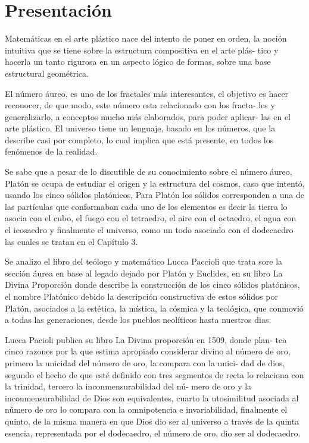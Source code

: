 \documentclass[a4paper]{book}
\begin{document}
\renewcommand\listtablename{Lista de tablas}
\listoftables
\newpage

\clearpage

\chapter*{Presentación}


Matemáticas en el arte plástico nace del intento de poner en orden, la
noción intuitiva que se tiene sobre la estructura compositiva en el arte plás-
tico y hacerla un tanto rigurosa en un aspecto lógico de formas, sobre una
base estructural geométrica.

El número áureo, es uno de los fractales más interesantes, el objetivo es
hacer reconocer, de que modo, este número esta relacionado con los fracta-
les y generalizarlo, a conceptos mucho más elaborados, para poder aplicar-
las en el arte plástico. El universo tiene un lenguaje, basado en los números,
que la describe casi por completo, lo cual implica que está presente, en todos
los fenómenos de la realidad.

Se sabe que a pesar de lo discutible de su conocimiento sobre el número
áureo, Platón se ocupa de estudiar el origen y la estructura del cosmos,
caso que intentó, usando los cinco sólidos platónicos, Para Platón los sólidos
corresponden a una de las partículas que conformaban cada uno de los
elementos es decir la tierra lo asocia con el cubo, el fuego con el tetraedro,
el aire con el octaedro, el agua con el icosaedro y finalmente el universo,
como un todo asociado con el dodecaedro las cuales se tratan en el Capítulo
3.

Se analizo el libro del teólogo y matemático Lucca Paccioli que trata
sore la sección áurea en base al legado dejado por Platón y Euclides, en
su libro La Divina Proporción donde describe la construcción de los cinco
sólidos platónicos, el nombre Platónico debido la descripción constructiva
de estos sólidos por Platón, asociados a la estética, la mística, la cósmica
y la teológica, que conmovió a todas las generaciones, desde los pueblos
neolíticos hasta nuestros dias.

Lucca Pacioli publica su libro La Divina proporción en 1509, donde plan-
tea cinco razones por la que estima apropiado considerar divino al número
de oro, primero la unicidad del número de oro, la compara con la unici-
dad de dios, segundo el hecho de que esté definido con tres segmentos de
recta lo relaciona con la trinidad, tercero la inconmensurabilidad del nú-
mero de oro y la inconmensurabilidad de Dios son equivalentes, cuarto la
utosimilitud asociada al número de oro lo compara con la omnipotencia e
invariabilidad, finalmente el quinto, de la misma manera en que Dios dio ser
al universo a través de la quinta esencia, representada por el dodecaedro,
el número de oro, dio ser al dodecaedro.
\end{document}
